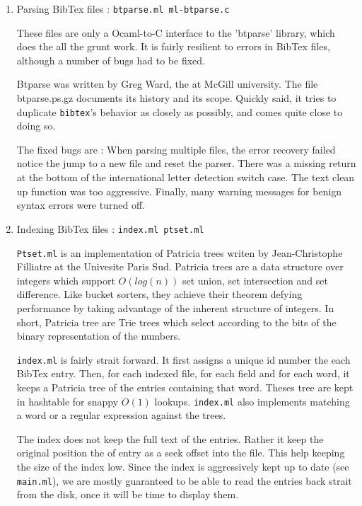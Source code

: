 \documentclass[11pt]{article}
\begin{document}
\begin{enumerate}
\item Parsing BibTex files : {\tt btparse.ml ml-btparse.c} 

  These files are only a Ocaml-to-C interface to the 'btparse'
  library, which does the all the grunt work.  It is fairly resilient
  to errors in BibTex files, although a number of bugs had to be fixed.

  Btparse was written by Greg Ward, the at McGill university. The file
  btparse.ps.gz documents its history and its scope. Quickly said, it
  tries to duplicate {\tt bibtex}'s behavior as closely as possibly,
  and comes quite close to doing so.

  The fixed bugs are : When parsing multiple files, the error recovery
  failed notice the jump to a new file and reset the parser. There was
  a missing return at the bottom of the international letter detection
  switch case. The text clean up function was too aggressive. Finally,
  many warning messages for benign syntax errors were turned off.

\item Indexing BibTex files : {\tt index.ml ptset.ml}

  {\tt Ptset.ml} is an implementation of Patricia trees writen by
  Jean-Christophe Filliatre at the Univesite Paris Sud. Patricia trees
  are a data structure over integers which support $O(log(n))$ set
  union, set intersection and set difference. Like bucket sorters,
  they achieve their theorem defying performance by taking advantage
  of the inherent structure of integers. In short, Patricia tree are
  Trie trees which select according to the bits of the binary
  representation of the numbers.

  {\tt index.ml} is fairly strait forward.  It first assigns a unique
  id number the each BibTex entry. Then, for each indexed file, for
  each field and for each word, it keeps a Patricia tree of the entries
  containing that word. Theses tree are kept in hashtable for snappy
  $O(1)$ lookups. {\tt index.ml} also implements matching a word or a
  regular expression against the trees.

  The index does not keep the full text of the entries. Rather it keep
  the original position the of entry as a seek offset into the
  file. This help keeping the size of the index low. Since the index
  is aggressively kept up to date (see {\tt main.ml}), we are mostly
  guaranteed to be able to read the entries back strait from the disk,
  once it will be time to display them.


\end{enumerate}
\end{document}
